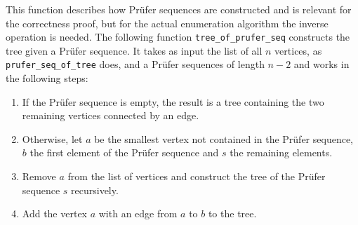 This function describes how Prüfer sequences are constructed and is relevant for the correctness proof, but for the actual enumeration algorithm the inverse operation is needed.
The following function \texttt{tree\_of\_prufer\_seq} constructs the tree given a Prüfer sequence.
It takes as input the list of all $n$ vertices, as \texttt{prufer\_seq\_of\_tree} does, and a Prüfer sequences of length $n - 2$ and works in the following steps:

\begin{enumerate}
    \item If the Prüfer sequence is empty, the result is a tree containing the two remaining vertices connected by an edge.
    \item Otherwise, let $a$ be the smallest vertex not contained in the Prüfer sequence, $b$ the first element of the Prüfer sequence and $s$ the remaining elements.
    \item Remove $a$ from the list of vertices and construct the tree of the Prüfer sequence $s$ recursively.
    \item Add the vertex $a$ with an edge from $a$ to $b$ to the tree.
\end{enumerate}

